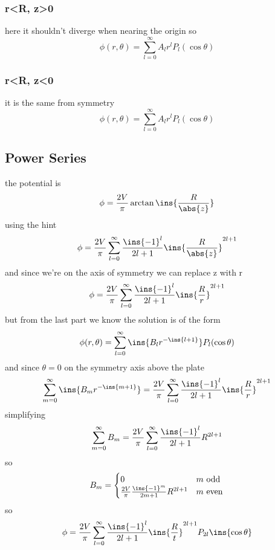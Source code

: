 \subsubsection{r<R, z>0}
here it shouldn't diverge when nearing the origin so 
\begin{equation}
	\phi(r,\theta) = \sum_{l=0}^{\infty}A_l r^l P_l(\cos\theta)
\end{equation}
\subsubsection{r<R, z<0}
it is the same from symmetry 
\begin{equation}
	\phi(r,\theta) = \sum_{l=0}^{\infty}A_l r^l P_l(\cos\theta)
\end{equation}
\subsection{Power Series}
the potential is 
\begin{equation}
	\phi = \frac{2V}{\pi}\arctan\ins{\frac{R}{\abs{z}}}
\end{equation}
using the hint 
\begin{equation}
	\phi = \frac{2V}{\pi}\sum_{l=0}^{\infty}\frac{\ins{-1}^l}{2l+1}\ins{\frac{R}{\abs{z}}}^{2l+1}
\end{equation}
and since we're on the axis of symmetry we can replace z with r 
\begin{equation}
	\phi = \frac{2V}{\pi}\sum_{l=0}^{\infty}\frac{\ins{-1}^l}{2l+1}\ins{\frac{R}{r}}^{2l+1}
\end{equation}
but from the last part we know the solution is of the form 
\begin{equation}
	\phi(r,\theta) = \sum_{l=0}^{\infty}\ins{B_l r^{-\ins{l+1}}}P_l(\cos\theta)
\end{equation}
and since \(\theta=0\) on the symmetry axis above the plate
\begin{equation}
	\sum_{m=0}^{\infty}\ins{B_m r^{-\ins{m+1}}}=\frac{2V}{\pi}\sum_{l=0}^{\infty}\frac{\ins{-1}^l}{2l+1}\ins{\frac{R}{r}}^{2l+1}
\end{equation}
simplifying
\begin{equation}
	\sum_{m=0}^{\infty}B_m=\frac{2V}{\pi}\sum_{l=0}^{\infty}\frac{\ins{-1}^l}{2l+1}{R}^{2l+1}
\end{equation}
so 
\begin{equation}
	B_m = \begin{cases}
		0 & m\text{ odd}\\
		\frac{2V}{\pi}\frac{\ins{-1}^m}{2m+1}R^{2l+1} & m\text{ even}
	\end{cases}
\end{equation}
so 
\begin{equation}
	\phi = \frac{2V}{\pi}\sum_{l=0}^{\infty}\frac{\ins{-1}^l}{2l+1}\ins{\frac{R}{t}}^{2l+1}P_{2l}\ins{\cos\theta}
\end{equation}
